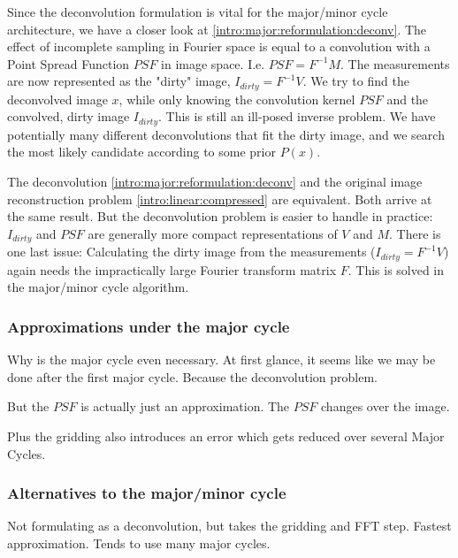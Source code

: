 Since the deconvolution formulation is vital for the major/minor cycle architecture, we have a closer look at \eqref{intro:major:reformulation:deconv}. The effect of incomplete sampling in Fourier space is equal to a convolution with a Point Spread Function $PSF$ in image space. I.e. $PSF = F^{-1}M$. The measurements are now represented as the "dirty" image, $I_{dirty} = F^{-1}V$. We try to find the deconvolved image $x$, while only knowing the convolution kernel $PSF$ and the convolved, dirty image $I_{dirty}$. This is still an ill-posed inverse problem. We have potentially many different deconvolutions that fit the dirty image, and we search the most likely candidate according to some prior $P(x)$. 

The deconvolution \eqref{intro:major:reformulation:deconv} and the original image reconstruction problem \eqref{intro:linear:compressed} are equivalent. Both arrive at the same result. But the deconvolution problem is easier to handle in practice: $I_{dirty}$ and $PSF$ are generally more compact representations of $V$ and $M$. There is one last issue: Calculating the dirty image from the measurements ($I_{dirty} = F^{-1}V$) again needs the impractically large Fourier transform matrix $F$. This is solved in the major/minor cycle algorithm.

\subsubsection{Approximations under the major cycle} \label{intro:major:approximations}
Why is the major cycle even necessary. At first glance, it seems like we may be done after the first major cycle. Because the deconvolution problem.

But the $PSF$ is actually just an approximation. The $PSF$ changes over the image.

Plus the gridding also introduces an error which gets reduced over several Major Cycles.





\subsubsection{Alternatives to the major/minor cycle}
Not formulating as a deconvolution, but takes the gridding and FFT step. Fastest approximation. Tends to use many major cycles.
